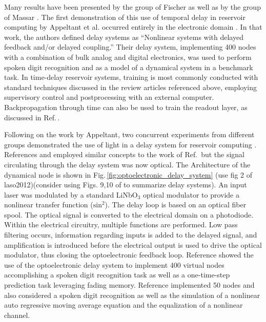 Many results have been presented by the group of Fischer \cite{apso2011,laso2012,orso2015,brfi2015,brso2013,bubr2017,buma2018,brpe2018} as well as by the group of Massar \cite{padu2012,dusc2012,anha2017}. The first demonstration of this use of temporal delay in reservoir computing by Appeltant et al. occurred entirely in the electronic domain \cite{apso2011}. In that work, the authors defined delay systems as ``Nonlinear systems with delayed feedback and/or delayed coupling.'' Their delay system, implementing 400 nodes with a combination of bulk analog and digital electronics, was used to perform spoken digit recognition and as a model of a dynamical system in a benchmark task. In time-delay reservoir systems, training is most commonly conducted with standard techniques discussed in the review articles referenced above, employing supervisory control and postprocessing with an external computer. Backpropagation through time can also be used to train the readout layer, as discussed in Ref.\,.

Following on the work by Appeltant, two concurrent experiments from different groups demonstrated the use of light in a delay system for reservoir computing \cite{padu2012,laso2012}. References  and  employed similar concepts to the work of Ref.\, but the signal circulating through the delay system was now optical. The Architecture of the dynamical node is shown in Fig.\,\ref{fig:optoelectronic_delay_system} (use fig 2 of laso2012)(consider using Figs. 9,10 of \cite{vabr2017} to summarize delay systems). An input laser was modulated by a standard LiNbO$_3$ optical modulator to provide a nonlinear transfer function ($\mathrm{sin}^2$). The delay loop is based on an optical fiber spool. The optical signal is converted to the electrical domain on a photodiode. Within the electrical circuitry, multiple functions are performed. Low pass filtering occurs, information regarding inputs is added to the delayed signal, and amplification is introduced before the electrical output is used to drive the optical modulator, thus closing the optoelectronic feedback loop. Reference  showed the use of the optoelectronic delay system to implement 400 virtual nodes accomplishing a spoken digit recognition task as well as a one-time-step prediction task leveraging fading memory. Reference  implemented 50 nodes and also considered a spoken digit recognition as well as the simulation of a nonlinear auto regressive moving average equation and the equalization of a nonlinear channel. 

